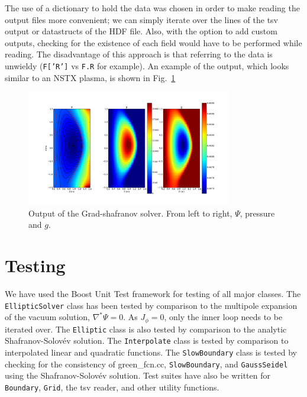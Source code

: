 \documentclass[paper=letter, fontsize=11pt]{scrartcl} %
\begin{document}
The use of a dictionary to hold the data was chosen in order to make reading the output files more convenient; we can simply iterate over the lines of the tsv output or datastructs of the HDF file. Also, with the option to add custom outputs, checking for the existence of each field would have to be performed while reading. The disadvantage of this approach is that referring to the data is unwieldy (\texttt{F['R']} vs \texttt{F.R} for example). An example of the output, which looks similar to an NSTX plasma, is shown in Fig.~\ref{fig:eqm}

\begin{figure}
	\centering
	\includegraphics[width=0.8\textwidth]{eqm}
	\caption{Output of the Grad-shafranov solver. From left to right, $\Psi$, pressure and $g$. }
	\label{fig:eqm}
\end{figure}



\section{Testing}

We have used the Boost Unit Test framework for testing of all major classes. The \texttt{EllipticSolver} class has been tested by comparison to the multipole expansion of the vacuum solution, $\nabla^* \Psi = 0$. As $J_{\phi} = 0$, only the inner loop needs to be iterated over. The \texttt{Elliptic} class is also tested by comparison to the analytic Shafranov-Solov\'ev solution. The \texttt{Interpolate} class is tested by comparison to interpolated linear and quadratic functions. The \texttt{SlowBoundary} class is tested by checking for the consistency of green\_fcn.cc, \texttt{SlowBoundary}, and \texttt{GaussSeidel} using the Shafranov-Solov\'ev solution. Test suites have also be written for \texttt{Boundary}, \texttt{Grid}, the tsv reader, and other utility functions.
\end{document}
